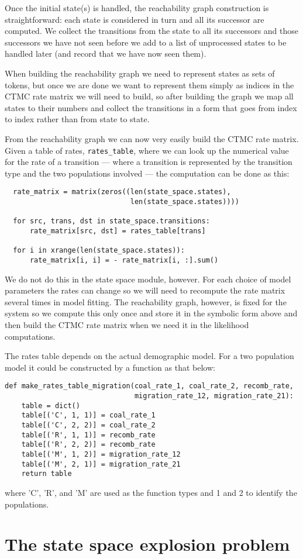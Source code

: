 Once the initial state(s) is handled, the reachability graph construction is straightforward: each state is considered in turn and all its successor are computed. We collect the transitions from the state to all its successors and those successors we have not seen before we add to a list of unprocessed states to be handled later (and record that we have now seen them).

When building the reachability graph we need to represent states as sets of tokens, but once we are done we want to represent them simply as indices in the CTMC rate matrix we will need to build, so after building the graph we map all states to their numbers and collect the transitions in a form that goes from index to index rather than from state to state.

From the reachability graph we can now very easily build the CTMC rate matrix. Given a table of rates, \texttt{rates_table}, where we can look up the numerical value for the rate of a transition --- where a transition is represented by the transition type and the two populations involved --- the computation can be done as this:

\begin{lstlisting}
  rate_matrix = matrix(zeros((len(state_space.states),
                              len(state_space.states))))

  for src, trans, dst in state_space.transitions:
      rate_matrix[src, dst] = rates_table[trans]

  for i in xrange(len(state_space.states)):
      rate_matrix[i, i] = - rate_matrix[i, :].sum()
\end{lstlisting}

We do not do this in the state space module, however. For each choice of model parameters the rates can change so we will need to recompute the rate matrix several times in model fitting. The reachability graph, however, is fixed for the system so we compute this only once and store it in the symbolic form above and then build the CTMC rate matrix when we need it in the likelihood computations.

The rates table depends on the actual demographic model. For a two population model it could be constructed by a function as that below:
\begin{lstlisting}
def make_rates_table_migration(coal_rate_1, coal_rate_2, recomb_rate,
                               migration_rate_12, migration_rate_21):
    table = dict()
    table[('C', 1, 1)] = coal_rate_1
    table[('C', 2, 2)] = coal_rate_2
    table[('R', 1, 1)] = recomb_rate
    table[('R', 2, 2)] = recomb_rate
    table[('M', 1, 2)] = migration_rate_12
    table[('M', 2, 1)] = migration_rate_21
    return table
\end{lstlisting}
where 'C', 'R', and 'M' are used as the function types and 1 and 2 to identify the populations.


\section{The state space explosion problem}


